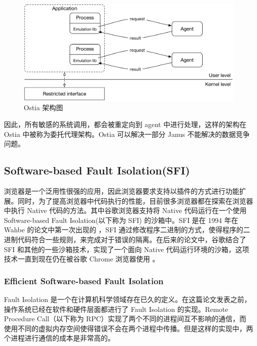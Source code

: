 \documentclass[final,12pt]{elsarticle}
\begin{document}
\begin{figure}
\centering
\includegraphics[width=0.8\linewidth]{imgs/ostia}
\caption{Ostia 架构图}
\label{fig:ostia}
\end{figure}

因此，所有敏感的系统调用，都会被重定向到 agent 中进行处理，这样的架构在 Ostia 中被称为委托代理架构。Ostia 可以解决一部分 Janus 不能解决的数据竞争问题。

\subsection{Software-based Fault Isolation(SFI)}
\label{ss:sfi}

浏览器是一个泛用性很强的应用，因此浏览器要求支持以插件的方式进行功能扩展。同时，为了提高浏览器中代码执行的性能，目前很多浏览器都在探索在浏览器中执行 Native 代码的方法。其中谷歌浏览器支持将 Native 代码运行在一个使用 Software-based Fault Isolation(以下称为 SFI) 的沙箱中。SFI 是在 1994 年在 Wahbe 的论文中第一次出现的 \cite{wahbe1994efficient}，SFI 通过修改程序二进制的方式，使得程序的二进制代码符合一些规则，来完成对于错误的隔离。在后来的论文中，谷歌结合了 SFI 和其他的一些沙箱技术，实现了一个面向 Native 代码运行环境的沙箱，这项技术一直到现在仍在被谷歌 Chrome 浏览器使用 \cite{nacl}。

\subsubsection{Efficient Software-based Fault Isolation}
\label{sss:esfi}

Fault Isolation 是一个在计算机科学领域存在已久的定义。在这篇论文发表之前，操作系统已经在软件和硬件层面都进行了 Fault Isolation 的实现。Remote Procedure Call（以下称为 RPC）实现了两个不同的进程间互不影响的通信，而使用不同的虚拟内存空间使得错误不会在两个进程中传播。但是这样的实现中，两个进程进行通信的成本是非常高的。
\end{document}
